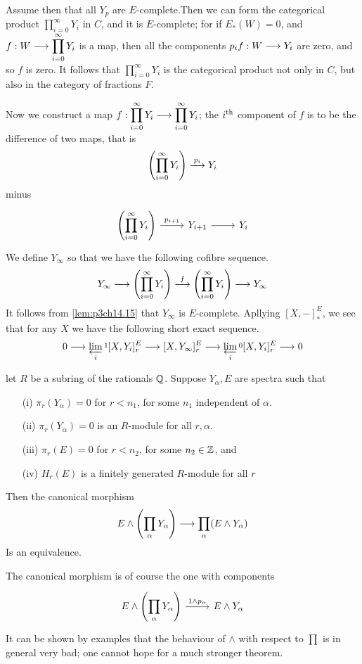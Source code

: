 \documentclass[../main]{subfiles}
\begin{document}
Assume then that all $Y_p$ are $E$-complete.Then we can form the categorical product $\displaystyle \prod_{i=0}^\infty Y_i $ in $C$, and it is $E$-complete; for if $E_\ast(W)=0$, and $\displaystyle f:W\overset{}{\longrightarrow} \prod_{i=0}^\infty Y_i$ is a map, then all the components $p_i f:W\overset{}{\longrightarrow}Y_i$ are zero, and so $f$ is zero. It follows that $\displaystyle\prod_{i=0}^\infty Y_i$ is the categorical product not only in $C$, but also in the category of fractions $F$.

Now we construct a map $\displaystyle f:\prod_{i=0}^\infty Y_i\overset{}{\longrightarrow}\prod_{i=0}^\infty Y_i$; the $i^{\text{th}}$ component of $f$ is to be the difference of two maps, that is $$\left( \prod_{i=0}^\infty Y_i\right)\overset{p_i}{\longrightarrow} Y_i$$
minus 
$$
\begin{tikzcd}
\displaystyle\left(\prod_{i=0}^\infty Y_i\right)\arrow[r,"p_{i+1}"] &Y_{i+1} \arrow[r] &Y_i
\end{tikzcd}
$$
We define $Y_\infty$ so that we have the following cofibre sequence.
$$Y_\infty\overset{}{\longrightarrow}\left(\prod_{i=0}^\infty Y_i\right)\overset{f}{\longrightarrow} \left(\prod_{i=0}^\infty Y_i\right)\overset{}{\longrightarrow} Y_\infty  $$
It follows from \ref{lem:p3ch14.15} that $Y_\infty$ is $E$-complete. Apllying $[X,-]^E_\ast$, we see that for any $X$ we have the following short exact sequence.
$$0\overset{}{\longrightarrow} \varprojlim_i\mathop{\mathrm{}}^1[X,Y_i]^E_r\overset{}{\longrightarrow}[X,Y_\infty]^E_r\overset{}{\longrightarrow}\varprojlim_i  \mathop{\mathrm{}}^0[X,Y_i]^E_r \overset{}{\longrightarrow} 0 $$

\begin{customthm}{15.2}\label{thm:p3ch15.2}
let $R$ be a subring of the rationals $\mathbb{Q}$. Suppose $Y_\alpha,E$ are spectra such that 
\begin{enumerate}
    \item[(i)] $\pi_r(Y_\alpha)=0$ for $r<n_1$, for some $n_1$ independent of $\alpha$.
    \item[(ii)] $\pi_r(Y_\alpha)=0$ is an $R$-module for all $r,\alpha$.
    \item[(iii)] $\pi_r(E)=0$ for $r<n_2$, for some $n_2\in \mathbb{Z}$, and
    \item[(iv)] $H_r(E)$ is a finitely generated $R$-module for all $r$
\end{enumerate}
Then the canonical morphism
$$E\wedge\left(\prod_\alpha Y_\alpha \right)\overset{}{\longrightarrow}\prod_\alpha (E\wedge Y_\alpha) $$
Is an equivalence.
\end{customthm}
The canonical morphism is of course the one with components 
$$
\begin{tikzcd}
E\wedge\left(\displaystyle\prod_\alpha Y_\alpha \right)\arrow[r,"1\wedge p_\alpha"]& E\wedge Y_\alpha\end{tikzcd} 
$$
It can be shown by examples that the behaviour of $\wedge$  with respect to $\displaystyle \prod$ is in general very bad; one cannot hope for a much stronger theorem.
\end{document}
